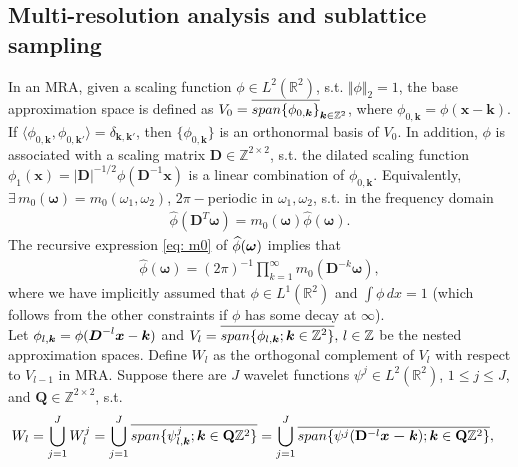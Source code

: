 \subsection{Multi-resolution analysis and sublattice sampling}
In an MRA, given a scaling function $\phi\in L^2(\mathbb{R}^2)$, s.t. $\Vert\phi\Vert_2=1$,
the base approximation space is defined as $V_0 = \overlinespace{span\{\phi_{0,\boldsymbol{k}}\}}_{\boldsymbol{k}\in\mathbb{Z}^2}$, where $\phi_{0,\boldsymbol{k}} = \phi(\boldsymbol{x}-\boldsymbol{k})$. If $\langle \phi_{0,\boldsymbol{k}},\phi_{0,\boldsymbol{k'}}\rangle = \delta_{\boldsymbol{k,k'}}$, then $\{\phi_{0,\boldsymbol{k}}\}$ is an orthonormal basis of $V_0$. In addition, $\phi$ is associated with a scaling matrix $\mathbf{D}\in\mathbb{Z}^{2\times 2}$, s.t. the dilated scaling function
 $\phi_1(\boldsymbol{x}) = |\mathbf{D}|^{-1/2}\phi(\mathbf{D}^{-1}\boldsymbol{x})$ is a linear combination of $\phi_{0,\boldsymbol{k}}$.
Equivalently, $\exists\,m_0(\boldsymbol{\omega}) = m_0(\omega_1,\omega_2)$, $2\pi-$periodic in $\omega_1,\omega_2$, s.t. in the frequency domain
\begin{align}\label{eq: m0}
\widehat{\phi}(\mathbf{D}^T\boldsymbol{\omega}) = m_0(\boldsymbol{\omega})\widehat{\phi}(\boldsymbol{\omega}).
\end{align}
The recursive expression \eqref{eq: m0} of $\widehat{\phi}(\boldsymbol{\omega})$ implies that
\begin{align}\label{eq: phi-m0}
\textstyle \widehat{\phi}(\boldsymbol{\omega}) = (2\pi)^{-1}\prod_{k=1}^{\infty}m_0(\mathbf{D}^{-k} \boldsymbol{\omega}),
\end{align}
where we have implicitly assumed that $\phi\in L^1(\mathbb{R}^2)$ and $\int\phi\,dx = 1$ (which follows from the other constraints if $\phi$ has some decay at $\infty$).
\\[.2em]
Let $\phi_{l,\boldsymbol{k}} = \phi(\boldsymbol{D}^{-l}\boldsymbol{x}-\boldsymbol{k})$
and $V_l = \overlinespace{span\{\phi_{l,\boldsymbol{k}};\boldsymbol{k}\in\mathbb{Z}^2\}},\,l\in\mathbb{Z}$ be the nested approximation spaces. Define $W_l$ as the orthogonal complement of $V_l$ with respect to $V_{l-1}$ in MRA. 
Suppose there are $J$ wavelet functions $\psi^j\in L^2(\mathbb{R}^2)$, {\small $1 \leq j \leq J$}, and $\mathbf{Q}\in\mathbb{Z}^{2\times2}$, s.t.
\begin{align*}
\hspace{-1em} W_l = \bigcup_{j=1}^J W_l^j = \bigcup_{j=1}^J \overline{span\{\psi^j_{l,\boldsymbol{k}};\boldsymbol{ k}\in \mathbf{Q}\mathbb{Z}^2\}}= \bigcup_{j=1}^J \overline{span\{\psi^j(\mathbf{D}^{-l}\boldsymbol{x-k});\boldsymbol{ k}\in \mathbf{Q}\mathbb{Z}^2\}},
\end{align*}
